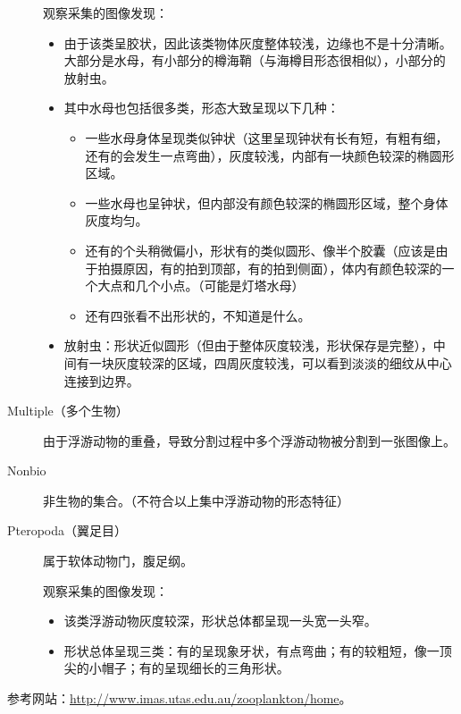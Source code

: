 \begin{description}
    观察采集的图像发现：
        \begin{itemize}
        \item 由于该类呈胶状，因此该类物体灰度整体较浅，边缘也不是十分清晰。大部分是水母，有小部分的樽海鞘（与海樽目形态很相似），小部分的放射虫。
        \item 其中水母也包括很多类，形态大致呈现以下几种：
            \begin{itemize}
            \item 一些水母身体呈现类似钟状（这里呈现钟状有长有短，有粗有细，还有的会发生一点弯曲），灰度较浅，内部有一块颜色较深的椭圆形区域。
            \item 一些水母也呈钟状，但内部没有颜色较深的椭圆形区域，整个身体灰度均匀。
            \item 还有的个头稍微偏小，形状有的类似圆形、像半个胶囊（应该是由于拍摄原因，有的拍到顶部，有的拍到侧面），体内有颜色较深的一个大点和几个小点。（可能是灯塔水母）
            \item 还有四张看不出形状的，不知道是什么。
            \end{itemize}
        \item 放射虫：形状近似圆形（但由于整体灰度较浅，形状保存是完整），中间有一块灰度较深的区域，四周灰度较浅，可以看到淡淡的细纹从中心连接到边界。
        \end{itemize}
    \item[{\color{blue}Multiple（多个生物）}] 由于浮游动物的重叠，导致分割过程中多个浮游动物被分割到一张图像上。
    \item[{\color{blue}Nonbio}] 非生物的集合。（不符合以上集中浮游动物的形态特征）
    \item[Pteropoda（翼足目）] 属于软体动物门，腹足纲。
    
    观察采集的图像发现：
    \begin{itemize}
    \item 该类浮游动物灰度较深，形状总体都呈现一头宽一头窄。
    \item 形状总体呈现三类：有的呈现象牙状，有点弯曲；有的较粗短，像一顶尖的小帽子；有的呈现细长的三角形状。
    \end{itemize}
\end{description}

参考网站：\url{http://www.imas.utas.edu.au/zooplankton/home}。
